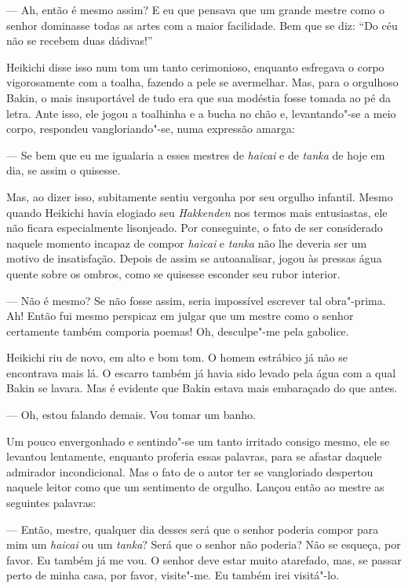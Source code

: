 --- Ah, então é mesmo assim? E eu que pensava que um grande mestre como o 
senhor dominasse todas as artes com a maior facilidade. Bem que se diz:
``Do céu não se recebem duas dádivas!''

Heikichi disse isso num tom um tanto cerimonioso, enquanto esfregava o
corpo vigorosamente com a toalha, fazendo a pele se avermelhar. Mas,
para o orgulhoso Bakin, o mais insuportável de tudo era que sua modéstia
fosse tomada ao pé da letra. Ante isso, ele jogou a toalhinha e a bucha
no chão e, levantando"-se a meio corpo, respondeu vangloriando"-se, 
numa expressão amarga:

--- Se bem que eu me igualaria a esses mestres de \emph{haicai} e de
\textit{tanka} de hoje em dia, se assim o quisesse.

Mas, ao dizer isso, subitamente sentiu vergonha por seu orgulho
infantil. Mesmo quando Heikichi havia elogiado seu \textit{Hakkenden}
nos termos mais entusiastas, ele não ficara especialmente lisonjeado.
Por conseguinte, o fato de ser considerado naquele momento incapaz de
compor \emph{haicai} e \textit{tanka} não lhe deveria ser um motivo de
insatisfação. Depois de assim se autoanalisar, jogou às pressas água
quente sobre os ombros, como se quisesse esconder seu rubor interior.

--- Não é mesmo? Se não fosse assim, seria impossível escrever tal
obra"-prima. Ah! Então fui mesmo perspicaz em julgar que um mestre
como o senhor certamente também comporia poemas! Oh, desculpe"-me pela gabolice.

Heikichi riu de novo, em alto e bom tom. O homem estrábico já não se
encontrava mais lá. O escarro também já havia sido levado pela água com
a qual Bakin se lavara. Mas é evidente que Bakin estava mais embaraçado
do que antes.

--- Oh, estou falando demais. Vou tomar um banho.

Um pouco envergonhado e sentindo"-se um tanto irritado consigo mesmo, ele
se levantou lentamente, enquanto proferia essas palavras, para se
afastar daquele admirador incondicional. Mas o fato de o autor ter se
vangloriado despertou naquele leitor como que um sentimento de orgulho.
Lançou então ao mestre as seguintes palavras:

--- Então, mestre, qualquer dia desses será que o senhor poderia compor
para mim um \emph{haicai} ou um \textit{tanka}? Será que o senhor não poderia?
Não se esqueça, por favor. Eu também já me vou. O senhor deve estar
muito atarefado, mas, se passar perto de minha casa, por favor,
visite"-me. Eu também irei visitá"-lo.

